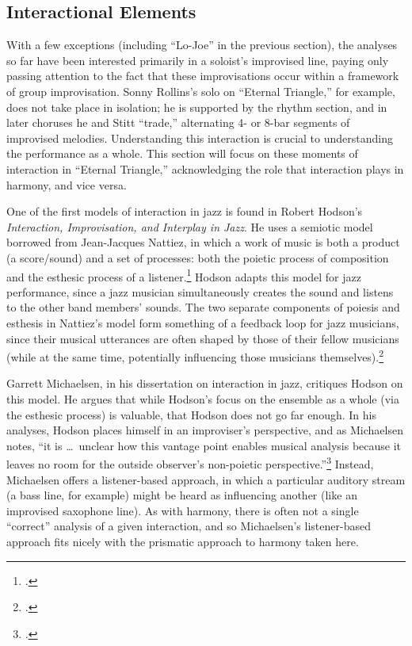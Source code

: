 \FloatBarrier
\subsection{Interactional Elements}

With a few exceptions (including ``Lo-Joe'' in the previous section), the
analyses so far have been interested primarily in a soloist's
improvised line, paying only passing attention to the fact that these
improvisations occur within a framework of group improvisation. Sonny
Rollins's solo on ``Eternal Triangle,'' for example, does not take place in
isolation; he is supported by the rhythm section, and in later choruses he and
Stitt ``trade,'' alternating 4- or 8-bar segments of improvised melodies.
Understanding this interaction is crucial to understanding the performance as
a whole. This section will focus on these moments of interaction in ``Eternal
Triangle,'' acknowledging the role that interaction plays in harmony, and vice
versa.

One of the first models of interaction in jazz is found in Robert Hodson's
\emph{Interaction, Improvisation, and Interplay in Jazz}. He uses a semiotic
model borrowed from Jean-Jacques Nattiez, in which a work of music is both a
product (a score/sound) and a set of processes: both the poietic process of
composition and the esthesic process of a
listener.\footcite[14--15]{hodson:2007} Hodson adapts this model for jazz
performance, since a jazz musician simultaneously creates the sound and
listens to the other band members' sounds. The two separate components of
poiesis and esthesis in Nattiez's model form something of a feedback loop for
jazz musicians, since their musical utterances are often shaped by those of
their fellow musicians (while at the same time, potentially influencing those
musicians themselves).\footcite[15--16]{hodson:2007}

Garrett Michaelsen, in his dissertation on interaction in jazz, critiques
Hodson on this model. He argues that while Hodson's focus on the ensemble as a
whole (via the esthesic process) is valuable, that Hodson does not go far
enough. In his analyses, Hodson places himself in an improviser's perspective,
and as Michaelsen notes, ``it is \ldots\ unclear how this vantage point
enables musical analysis because it leaves no room for the outside observer's
non-poietic perspective.''\footcite[24--25]{michaelsen:2013} Instead,
Michaelsen offers a listener-based approach, in which a particular auditory
stream (a bass line, for example) might be heard as influencing another (like
an improvised saxophone line). As with harmony, there is often not a
single ``correct'' analysis of a given interaction, and so Michaelsen's
listener-based approach fits nicely with the prismatic approach to harmony
taken here.

